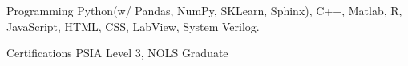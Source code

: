 

\begin{cvskills}

  \cvskill
    {Programming} %
    {Python(w/ Pandas, NumPy, SKLearn, Sphinx), C++, Matlab, R, JavaScript, HTML, CSS, LabView, System Verilog.} %

  \cvskill
    {Certifications} %
    {PSIA Level 3, NOLS Graduate} %

\end{cvskills}
